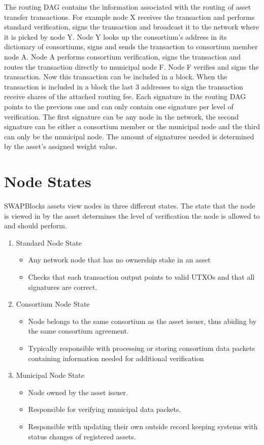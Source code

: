 \documentclass[12pt]{article}
\begin{document}
The routing DAG contains the information associated with the routing of asset 
transfer transactions.  For example node X receives the transaction and performs standard 
verification, signs the transaction and broadcast it to the network where it is picked
by node Y. Node Y looks up the consortium's address in its dictionary of 
consortiums, signs and sends the transaction to consortium member node A. Node A performs 
consortium verification, signs the transaction and routes the transaction directly to 
municipal node F.  Node F verifies and signs the transaction. 
Now this transaction can be included in a block.  When the 
transaction is included in a block the last 3 addresses to sign the transaction 
receive shares of the attached routing fee.  Each signature in the routing DAG points 
to the previous one and can only contain one signature per level of verification.  
The first signature can be any node in the network, 
the second signature can be either a consortium member or the municipal node 
and the third can only be the municipal node.  The amount of signatures needed 
is determined by the asset's assigned weight value. 




\section{Node States}

SWAPBlocks assets view nodes in three different states. The state that the node is viewed in 
by the asset determines the level of verification the node is allowed to and should
perform.


\begin{enumerate}
	\item Standard Node State
		\begin{itemize}
			\item{Any network node that has no ownership stake in an asset}
			\item{Checks that each transaction output points to valid UTXOs
				and that all signatures are correct.}
		\end{itemize}
	\item Consortium Node State
		\begin{itemize}
			\item{Node belongs to the same consortium as the asset issuer,
				thus abiding by the same consortium agreement.}
			\item{Typically responsible with processing  or storing
				consortium data packets containing information 
				needed for additional verification}
		\end{itemize}
	\item Municipal Node State
		\begin{itemize}
			\item{Node owned by the asset issuer.}
			\item{Responsible for verifying municipal data packets.}
			\item{Responsible with updating their own outside record keeping systems 
				with status changes of registered assets.}	
		\end{itemize}
\end{enumerate}
\end{document}
